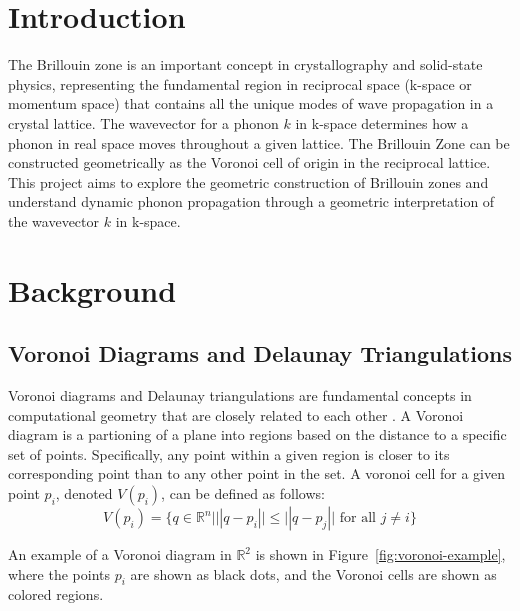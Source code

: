 \documentclass{article}
\begin{document}

\section{Introduction}
The Brillouin zone is an important concept in crystallography and solid-state physics, representing the fundamental region in reciprocal space (k-space or momentum space) that contains all the unique modes of wave propagation in a crystal lattice. The wavevector for a phonon $k$ in k-space determines how a phonon in real space moves throughout a given lattice. The Brillouin Zone can be constructed geometrically as the Voronoi cell of origin in the reciprocal lattice. This project aims to explore the geometric construction of Brillouin zones and understand dynamic phonon propagation through a geometric interpretation of the wavevector $k$ in k-space. 

\section{Background}
\subsection{Voronoi Diagrams and Delaunay Triangulations}
Voronoi diagrams and Delaunay triangulations are fundamental concepts in computational geometry that are closely related to each other \cite{lecture-notes-mount,lecture_notes_professor}. A Voronoi diagram is a partioning of a plane into regions based on the distance to a specific set of points. Specifically, any point within a given region is closer to its corresponding point than to any other point in the set. A voronoi cell for a given point $p_i$, denoted $V(p_i)$, can be defined as follows:
\begin{equation}
    V(p_i) = \{ q \in \mathbb{R}^n | ||q - p_i|| \leq ||q - p_j|| \text{ for all } j \neq i \}
\end{equation}

An example of a Voronoi diagram in $\mathbb{R}^2$ is shown in Figure~\ref{fig:voronoi-example}, where the points $p_i$ are shown as black dots, and the Voronoi cells are shown as colored regions.
\end{document}
